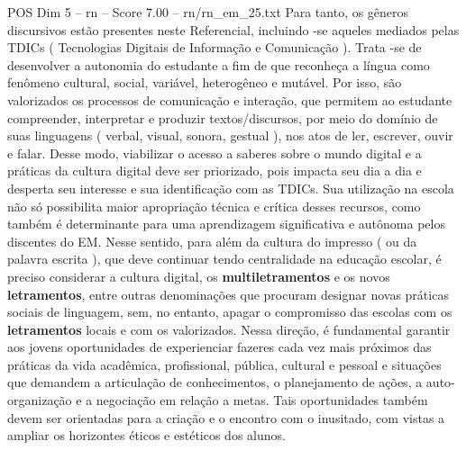 \begin{textsample}{POS Dim 5 – rn – Score 7.00 – rn/rn\_em\_25.txt}
Para tanto, os gêneros discursivos estão presentes neste Referencial, incluindo -se aqueles mediados pelas TDICs ( Tecnologias Digitais de Informação e Comunicação ).
Trata -se de desenvolver a autonomia do estudante a fim de que reconheça a língua como fenômeno cultural, social, variável, heterogêneo e mutável.
Por isso, são valorizados os processos de comunicação e interação, que permitem ao estudante compreender, interpretar e produzir textos/discursos, por meio do domínio de suas linguagens ( verbal, visual, sonora, gestual ), nos atos de ler, escrever, ouvir e falar.
Desse modo, viabilizar o acesso a saberes sobre o mundo digital e a práticas da cultura digital deve ser priorizado, pois impacta seu dia a dia e desperta seu interesse e sua identificação com as TDICs.
Sua utilização na escola não só possibilita maior apropriação técnica e crítica desses recursos, como também é determinante para uma aprendizagem significativa e autônoma pelos discentes do EM.
Nesse sentido, para além da cultura do impresso ( ou da palavra escrita ), que deve continuar tendo centralidade na educação escolar, é preciso considerar a cultura digital, os \textbf{multiletramentos} e os novos \textbf{letramentos}, entre outras denominações que procuram designar novas práticas sociais de linguagem, sem, no entanto, apagar o compromisso das escolas com os \textbf{letramentos} locais e com os valorizados.
Nessa direção, é fundamental garantir aos jovens oportunidades de experienciar fazeres cada vez mais próximos das práticas da vida acadêmica, profissional, pública, cultural e pessoal e situações que demandem a articulação de conhecimentos, o planejamento de ações, a auto-organização e a negociação em relação a metas.
Tais oportunidades também devem ser orientadas para a criação e o encontro com o inusitado, com vistas a ampliar os horizontes éticos e estéticos dos alunos.

\end{textsample}
